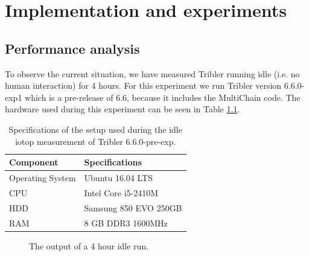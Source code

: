 \chapter{Implementation and experiments}
\label{implementation_and_experiments}

\section{Performance analysis}
To observe the current situation, we have measured Tribler running idle (i.e. no human interaction) for 4 hours.
For this experiment we run Tribler version 6.6.0-exp1 which is a pre-release of 6.6, because it includes the MultiChain code.
The hardware used during this experiment can be seen in Table \ref{table:tribler_idle}.

\begin{table}[h]
	\centering
	\begin{tabular}{l|l}
		\textbf{Component} 	& \textbf{Specifications} \\ \hline
		Operating System   	& Ubuntu 16.04 LTS \\
		CPU					& Intel Core i5-2410M \\ 
		HDD					& Samsung 850 EVO 250GB  \\ 
		RAM					& 8 GB DDR3 1600MHz \\
	\end{tabular}
	\caption{Specifications of the setup used during the idle iotop measurement of Tribler 6.6.0-pre-exp.}
	\label{table:tribler_idle}
\end{table}

\begin{figure}[h]
	\caption{The output of a 4 hour idle run.}
	\label{fig:htop_io_idle_run}
\end{figure} 

